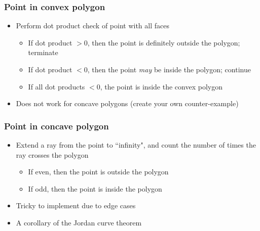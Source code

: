 \documentclass{beamer}
\begin{document}
\begin{frame}
 \frametitle{Point in convex polygon}
 \begin{itemize}
  \item Perform dot product check of point with all faces
  \begin{itemize}
   \item If dot product $> 0$, then the point is definitely outside the
         polygon; terminate
   \item If dot product $< 0$, then the point \emph{may} be inside the
         polygon; continue
   \item If all dot products $< 0$, the point is inside the convex
         polygon
  \end{itemize}
  \item Does not work for concave polygons (create your own
        counter-example)
 \end{itemize}
\end{frame}

\begin{frame}
 \frametitle{Point in concave polygon}
 \begin{itemize}
  \item Extend a ray from the point to ``infinity", and count the number
        of times the ray crosses the polygon
  \begin{itemize}
   \item If even, then the point is outside the polygon
   \item If odd, then the point is inside the polygon
  \end{itemize}
 \end{itemize}
 \begin{center}
  \scalebox{1.0} {
  }
 \end{center}
 \begin{itemize}
  \item Tricky to implement due to edge cases
  \item A corollary of the Jordan curve theorem
 \end{itemize}
\end{frame}
\end{document}
